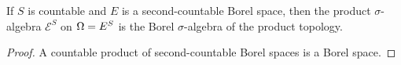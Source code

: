 \begin{lemma}
    \label{lem:lc-borel}
    \leanok

    If $S$ is countable and $E$ is a second-countable Borel space, then the product
    $\sigma$-algebra $\mathcal{E}^S$ on $\Omega = E^S$ is the Borel $\sigma$-algebra of the product
    topology.
\end{lemma}
\begin{proof}
    \leanok

    A countable product of second-countable Borel spaces is a Borel space.
\end{proof}
